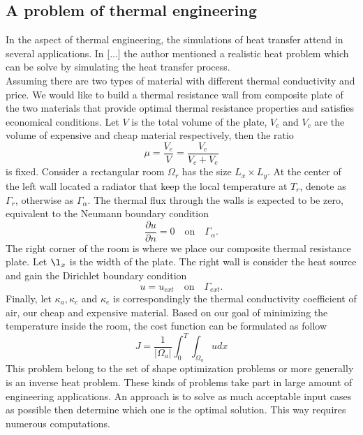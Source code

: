 \subsection{A problem of thermal engineering}
In the aspect of thermal engineering, the simulations of heat transfer attend in several applications. In [...] the author mentioned a realistic heat problem which can be solve by simulating the heat transfer process.\\
Assuming there are two types of material with different thermal conductivity and price. We would like to build a thermal resistance wall from composite plate of the two materials that provide optimal thermal resistance properties and satisfies economical conditions. Let $V$ is the total volume of the plate, $V_e$ and $V_c$ are the volume of expensive and cheap material respectively, then the ratio
$$
\mu = \dfrac{V_e}{V} = \dfrac{V_e}{V_c + V_e}
$$
is fixed. Consider a rectangular room $\Omega_r$ has the size $L_x \times L_y$. At the center of the left wall located a radiator that keep the local temperature at $T_r$, denote as $\Gamma_r$, otherwise as $\Gamma_\alpha$. The thermal flux through the walls is expected to be zero, equivalent to the Neumann boundary condition
$$
\dfrac{\partial u}{\partial n} = 0 \quad \text{on} \quad \Gamma_\alpha.
$$
The right corner of the room is where we place our composite thermal resistance plate. Let $\l_x$ is the width of the plate. The right wall is consider the heat source and gain the Dirichlet boundary condition
$$
u = u_{ext} \quad \text{on} \quad \Gamma_{ext}.
$$
Finally, let $\kappa_a, \kappa_c$ and $\kappa_e$ is correspondingly the thermal conductivity coefficient of air, our cheap and expensive material. Based on our goal of minimizing the temperature inside the room, the cost function can be formulated as follow
$$
J = \dfrac{1}{|\Omega_a|}\int_{0}^{T} \int_{\Omega_a} u dx 
$$
This problem belong to the set of shape optimization problems or more generally is an inverse heat problem. These kinds of problems take part in large amount of engineering applications. An approach is to solve as much acceptable input cases as possible then determine which one is the optimal solution. This way requires numerous computations.
